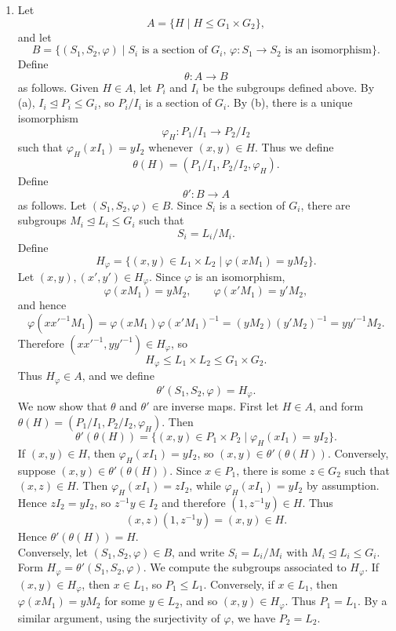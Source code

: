 \documentclass[../Odyssey_Project.tex]{subfiles}
\begin{document}
\begin{solution}
\begin{enumerate}
        \item[(c)] Let
    \[
        A = \{H \mid H \leq G_1 \times G_2\},
    \]
    and let
    \[
        B
        =
        \{(S_1,S_2,\varphi) \mid S_i \text{ is a section of } G_i,\,
        \varphi \colon S_1 \to S_2 \text{ is an isomorphism}\}.
    \]
    Define
    \[
        \theta \colon A \to B
    \]
    as follows. Given $H \in A$, let $P_i$ and $I_i$ be the subgroups defined above. By (a), $I_i \trianglelefteq P_i \leq G_i$, so $P_i/I_i$ is a section of $G_i$. By (b), there is a unique isomorphism
    \[
        \varphi_H \colon P_1/I_1 \to P_2/I_2
    \]
    such that $\varphi_H(xI_1) = yI_2$ whenever $(x,y) \in H$. Thus we define
    \[
        \theta(H) = (P_1/I_1,P_2/I_2,\varphi_H).
    \]
    Define
    \[
        \theta' \colon B \to A
    \]
    as follows. Let $(S_1,S_2,\varphi) \in B$. Since $S_i$ is a section of $G_i$, there are subgroups $M_i \trianglelefteq L_i \leq G_i$ such that
    \[
        S_i = L_i/M_i.
    \]
    Define
    \[
        H_{\varphi}
        =
        \{(x,y) \in L_1 \times L_2 \mid \varphi(xM_1) = yM_2\}.
    \]
    Let $(x,y),(x',y') \in H_{\varphi}$. Since $\varphi$ is an isomorphism,
    \[
        \varphi(xM_1) = yM_2,
        \qquad
        \varphi(x'M_1) = y'M_2,
    \]
    and hence
    \[
        \varphi(xx'^{-1}M_1)
        =
        \varphi(xM_1)\varphi(x'M_1)^{-1}
        =
        (yM_2)(y'M_2)^{-1}
        =
        yy'^{-1}M_2.
    \]
    Therefore $(xx'^{-1},yy'^{-1}) \in H_{\varphi}$, so
    \[
        H_{\varphi} \leq L_1 \times L_2 \leq G_1 \times G_2.
    \]
    Thus $H_{\varphi} \in A$, and we define
    \[
        \theta'(S_1,S_2,\varphi) = H_{\varphi}.
    \]
    We now show that $\theta$ and $\theta'$ are inverse maps. First let $H \in A$, and form $\theta(H) = (P_1/I_1,P_2/I_2,\varphi_H)$. Then
    \[
        \theta'(\theta(H))
        =
        \{(x,y) \in P_1 \times P_2 \mid \varphi_H(xI_1) = yI_2\}.
    \]
    If $(x,y) \in H$, then $\varphi_H(xI_1) = yI_2$, so $(x,y) \in \theta'(\theta(H))$. Conversely, suppose $(x,y) \in \theta'(\theta(H))$. Since $x \in P_1$, there is some $z \in G_2$ such that $(x,z) \in H$. Then $\varphi_H(xI_1) = zI_2$, while $\varphi_H(xI_1) = yI_2$ by assumption. Hence $zI_2 = yI_2$, so $z^{-1}y \in I_2$ and therefore $(1,z^{-1}y) \in H$. Thus
    \[
        (x,z)(1,z^{-1}y) = (x,y) \in H.
    \]
    Hence $\theta'(\theta(H)) = H$. \\
    Conversely, let $(S_1,S_2,\varphi) \in B$, and write $S_i = L_i/M_i$ with $M_i \trianglelefteq L_i \leq G_i$. Form $H_{\varphi} = \theta'(S_1,S_2,\varphi)$. We compute the subgroups associated to $H_{\varphi}$. If $(x,y) \in H_{\varphi}$, then $x \in L_1$, so $P_1 \leq L_1$. Conversely, if $x \in L_1$, then $\varphi(xM_1) = yM_2$ for some $y \in L_2$, and so $(x,y) \in H_{\varphi}$. Thus $P_1 = L_1$. By a similar argument, using the surjectivity of $\varphi$, we have $P_2 = L_2$. \\

\end{enumerate}
\end{solution}
\end{document}

